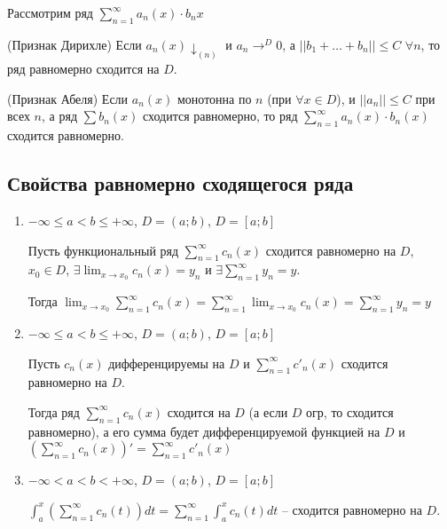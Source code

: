 Рассмотрим ряд $\sum_{n=1}^{\infty} a_n(x) \cdot b_n{x}$

\begin{theorem}
(Признак Дирихле) Если $a_n(x) \downarrow_{(n)}$ и $a_n \to^D 0$, а $||b_1 + \dots + b_n|| \leq C$ $\forall n$, то ряд равномерно сходится на $D$.
\end{theorem}

\begin{theorem}
(Признак Абеля) Если $a_n(x)$ монотонна по $n$ (при $\forall x \in D$), и $||a_n|| \leq C$ при всех $n$, а ряд $\sum b_n(x)$ сходится равномерно, то ряд $\sum_{n=1}^{\infty} a_n(x) \cdot b_n(x)$ сходится равномерно.
\end{theorem}

\subsection{Свойства равномерно сходящегося ряда}

\begin{enumerate}
    \item $-\infty \leq a < b \leq +\infty$, $D= (a; b)$, $D = [a; b]$
          
          Пусть функциональный ряд $\sum_{n=1}^{\infty} c_n(x)$ сходится равномерно на $D$, $x_0 \in D$, $\exists \lim_{x \to x_0} c_n(x) = y_n$ и $\exists \sum_{n=1}^{\infty} y_n = y$.

          Тогда $\lim_{x \to x_0} \sum_{n = 1}^{\infty} c_n(x) = \sum_{n=1}^{\infty} \lim_{x \to x_0} c_n(x) = \sum_{n=1}^{\infty} y_n = y$
    \item $-\infty \leq a < b \leq +\infty$, $D= (a; b)$, $D = [a; b]$
          
          Пусть $c_n(x)$ дифференцируемы на $D$ и $\sum_{n=1}^{\infty} c'_n(x)$ сходится равномерно на $D$.

          Тогда ряд $\sum_{n=1}^{\infty} c_n(x)$ сходится на $D$ (а если $D$ огр, то сходится равномерно), а его сумма будет дифференцируемой функцией на $D$ и $\left(\sum_{n=1}^{\infty} c_n(x)\right)' = \sum_{n=1}^{\infty} c'_n(x)$
    \item $-\infty < a < b < +\infty$, $D= (a; b)$, $D = [a; b]$
    
          $\int_{a}^{x}\left(\sum_{n=1}^{\infty} c_n(t)\right) dt = \sum_{n=1}^{\infty} \int_{a}^{x} c_n(t) dt$ -- сходится равномерно на $D$.
\end{enumerate}
